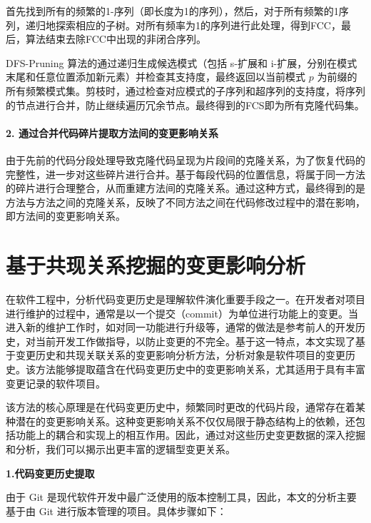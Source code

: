 首先找到所有的频繁的1-序列（即长度为1的序列），然后，对于所有频繁的1序列，递归地探索相应的子树。对所有频率为1的序列进行此处理，得到FCC，最后，算法结束去除FCC中出现的非闭合序列。
    

DFS-Pruning 算法的通过递归生成候选模式（包括 s-扩展和 i-扩展，分别在模式末尾和任意位置添加新元素）并检查其支持度，最终返回以当前模式 $p$ 为前缀的所有频繁模式集。剪枝时，通过检查对应模式的子序列和超序列的支持度，将序列的节点进行合并，防止继续遍历冗余节点。最终得到的FCS即为所有克隆代码集。

\paragraph{2. 通过合并代码碎片提取方法间的变更影响关系}

由于先前的代码分段处理导致克隆代码呈现为片段间的克隆关系，为了恢复代码的完整性，进一步对这些碎片进行合并。基于每段代码的位置信息，将属于同一方法的碎片进行合理整合，从而重建方法间的克隆关系。通过这种方式，最终得到的是方法与方法之间的克隆关系，反映了不同方法之间在代码修改过程中的潜在影响，即方法间的变更影响关系。

\section{基于共现关系挖掘的变更影响分析}

在软件工程中，分析代码变更历史是理解软件演化重要手段之一。在开发者对项目进行维护的过程中，通常是以一个提交（commit）为单位进行功能上的变更。当进入新的维护工作时，如对同一功能进行升级等，通常的做法是参考前人的开发历史，对当前开发工作做指导，以防止变更的不完全。基于这一特点，本文实现了基于变更历史和共现关联关系的变更影响分析方法，分析对象是软件项目的变更历史。该方法能够提取蕴含在代码变更历史中的变更影响关系，尤其适用于具有丰富变更记录的软件项目。

该方法的核心原理是在代码变更历史中，频繁同时更改的代码片段，通常存在着某种潜在的变更影响关系。这种变更影响关系不仅仅局限于静态结构上的依赖，还包括功能上的耦合和实现上的相互作用。因此，通过对这些历史变更数据的深入挖掘和分析，我们可以揭示出更丰富的逻辑型变更关系。

\noindent \textbf{1.代码变更历史提取}

由于 Git 是现代软件开发中最广泛使用的版本控制工具，因此，本文的分析主要基于由 Git 进行版本管理的项目。具体步骤如下：

